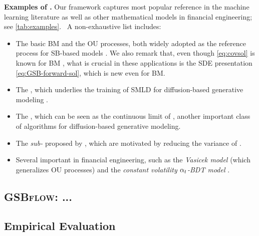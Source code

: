 \textbf{Examples of .}
Our framework captures most popular reference  in the machine learning literature as well as other mathematical models in financial engineering; see \cref{tab:examples}.%
~A non-exhaustive list includes:
\begin{itemize}[leftmargin=.5cm,itemsep=.01cm,topsep=0cm]
\item The basic \acrfull{BM} and the \acrfull{OU} processes, both widely adopted as the reference process for \acrshort{SB}-based models \citep{de2021simulating, de2021diffusion, lavenant2021towards, vargas2021solving, wang2021deep}. We also remark that, even though \eqref{eq:covsol} is known for \acrshort{BM} \citep{mallasto2021entropy}, what is crucial in these applications is the \acrshort{SDE} presentation \eqref{eq:GSB-forward-sol}, which is new even for BM.
\item The , which underlies the training of \acrlong{SMLD} for diffusion-based generative modeling \citep{huang2021variational, song2019generative, song2020score}.
\item The , which can be seen as the continuous limit of  \citep{ho2020denoising, sohl2015deep, song2020score}, another important class of algorithms for diffusion-based generative modeling.
\item The \emph{sub-} proposed by \citep{song2020score}, which are motivated by reducing the variance of .
\item Several important  in financial engineering, such as the \emph{Vasicek model} (which generalizes \acrshort{OU} processes) and the \emph{constant volatility $\alpha_{ t }$-\acrfull{BDT} model} \citep{platen2010numerical}. 
\end{itemize}


\subsection{\textsc{GSBflow}: ...}


\subsection{Empirical Evaluation}
\label{sec:experiments}


